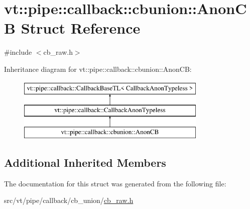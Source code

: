 \hypertarget{structvt_1_1pipe_1_1callback_1_1cbunion_1_1_anon_c_b}{}\section{vt\+:\+:pipe\+:\+:callback\+:\+:cbunion\+:\+:Anon\+CB Struct Reference}
\label{structvt_1_1pipe_1_1callback_1_1cbunion_1_1_anon_c_b}


{\ttfamily \#include $<$cb\+\_\+raw.\+h$>$}

Inheritance diagram for vt\+:\+:pipe\+:\+:callback\+:\+:cbunion\+:\+:Anon\+CB\+:\begin{figure}[H]
\begin{center}
\leavevmode
\includegraphics[height=3.000000cm]{structvt_1_1pipe_1_1callback_1_1cbunion_1_1_anon_c_b}
\end{center}
\end{figure}
\subsection*{Additional Inherited Members}


The documentation for this struct was generated from the following file\+:\begin{DoxyCompactItemize}
\item 
src/vt/pipe/callback/cb\+\_\+union/\hyperlink{cb__raw_8h}{cb\+\_\+raw.\+h}\end{DoxyCompactItemize}
